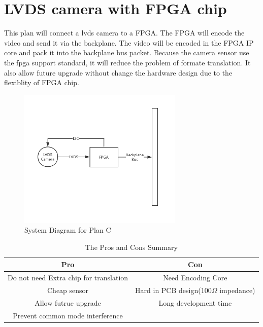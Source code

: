 \documentclass[12pt,article]{memoir}
\begin{document}
\section{LVDS camera with FPGA chip}
This plan will connect a lvds camera to a FPGA. The FPGA will encode the video and send it via the backplane. The video will be encoded in the FPGA IP core and pack it into the backplane bus packet. Because the camera sensor use the fpga support standard, it will reduce the problem of formate translation. It also allow future upgrade without change the hardware design due to the flexiblity of FPGA chip.
\begin{figure}[htp]
\begin{center}
\includegraphics[width=0.7\textwidth]{img/DR00002_Plan3.png}
 \caption{System Diagram for Plan C}	
\end{center}
\end{figure}
\begin{table}[H]
	\centering
		\begin{tabu}{c | c }
		Pro & Con \\ \hline
		Do not need Extra chip for translation & Need Encoding Core \\
		Cheap sensor & Hard in PCB design(100$\Omega$ impedance) \\
		Allow futrue upgrade & Long development time \\
		Prevent common mode interference  &  \\
		\end{tabu}
	\caption{The Pros and Cons Summary}
\end{table}
\newpage
\end{document}
